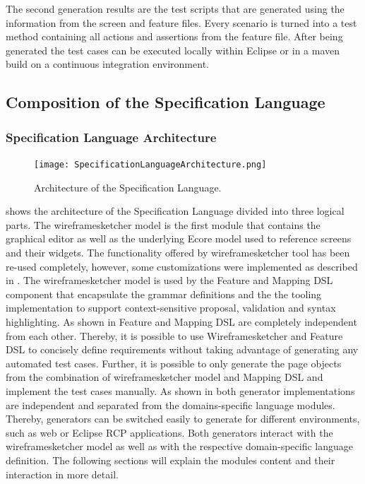 \documentclass{sig-alternate-05-2015}
\begin{document}
The second generation results are the test scripts that are generated using the information from the screen and feature files.
Every scenario is turned into a test method containing all actions and assertions from the feature file.
After being generated the test cases can be executed locally within Eclipse or in a maven build on a continuous integration environment.

\subsection{Composition of the Specification Language}
\subsubsection{Specification Language Architecture}
\begin{figure}[h]
	\centering
	\texttt{[image: SpecificationLanguageArchitecture.png]}
	\caption{Architecture of the Specification Language.}
	\label{fig:architectureOverview}
\end{figure}

 shows the architecture of the Specification Language divided into three logical parts. 
The wireframesketcher model is the first module that contains the graphical editor as well as the underlying Ecore model used to reference screens and their widgets.
The functionality offered by wireframesketcher tool has been re-used completely, however, some customizations were implemented as described in .
The wireframesketcher model is used by the Feature and Mapping DSL component that encapsulate the grammar definitions and the the tooling implementation to support context-sensitive proposal, validation and syntax highlighting.
As shown in  Feature and Mapping DSL are completely independent from each other.
Thereby, it is possible to use Wireframesketcher and Feature DSL to concisely define requirements without taking advantage of generating any automated test cases.
Further, it is possible to only generate the page objects from the combination of wireframesketcher model and Mapping DSL and implement the test cases manually.
As shown in  both generator implementations are independent and separated from the domains-specific language modules.
Thereby, generators can be switched easily to generate for different environments, such as web or Eclipse RCP applications.
Both generators interact with the wireframesketcher model as well as with the respective domain-specific language definition.
The following sections will explain the modules content and their interaction in more detail.
\end{document}
